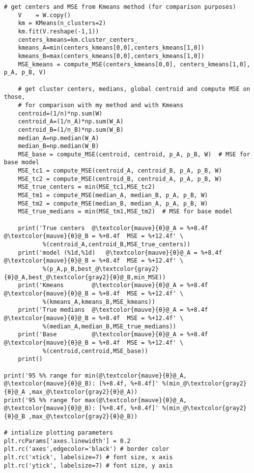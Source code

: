 \documentclass[oneside,10pt]{book}
\begin{document}
\begin{lstlisting}[escapechar=@]
    # get centers and MSE from Kmeans method (for comparison purposes)
    V    = W.copy()
    km = KMeans(n_clusters=2)
    km.fit(V.reshape(-1,1))
    centers_kmeans=km.cluster_centers_
    kmeans_A=min(centers_kmeans[0,0],centers_kmeans[1,0])
    kmeans_B=max(centers_kmeans[0,0],centers_kmeans[1,0])
    MSE_kmeans = compute_MSE(centers_kmeans[0,0], centers_kmeans[1,0], p_A, p_B, V)

    # get cluster centers, medians, global centroid and compute MSE on those,
    # for comparison with my method and with Kmeans
    centroid=(1/n)*np.sum(W)
    centroid_A=(1/n_A)*np.sum(W_A)
    centroid_B=(1/n_B)*np.sum(W_B)
    median_A=np.median(W_A)
    median_B=np.median(W_B)
    MSE_base = compute_MSE(centroid, centroid, p_A, p_B, W)  # MSE for base model
    MSE_tc1 = compute_MSE(centroid_A, centroid_B, p_A, p_B, W)
    MSE_tc2 = compute_MSE(centroid_B, centroid_A, p_A, p_B, W)
    MSE_true_centers = min(MSE_tc1,MSE_tc2)
    MSE_tm1 = compute_MSE(median_A, median_B, p_A, p_B, W)
    MSE_tm2 = compute_MSE(median_B, median_A, p_A, p_B, W)
    MSE_true_medians = min(MSE_tm1,MSE_tm2)  # MSE for base model

    print('True centers  @\textcolor{mauve}{θ}@_A = %+8.4f  @\textcolor{mauve}{θ}@_B = %+8.4f  MSE = %+12.4f' \
           %(centroid_A,centroid_B,MSE_true_centers))
    print('model (%1d,%1d)   @\textcolor{mauve}{θ}@_A = %+8.4f  @\textcolor{mauve}{θ}@_B = %+8.4f  MSE = %+12.4f' \
           %(p_A,p_B,best_@\textcolor{gray2}{θ}@_A,best_@\textcolor{gray2}{θ}@_B,min_MSE))
    print('Kmeans        @\textcolor{mauve}{θ}@_A = %+8.4f  @\textcolor{mauve}{θ}@_B = %+8.4f  MSE = %+12.4f' \
           %(kmeans_A,kmeans_B,MSE_kmeans))
    print('True medians  @\textcolor{mauve}{θ}@_A = %+8.4f  @\textcolor{mauve}{θ}@_B = %+8.4f  MSE = %+12.4f' \
           %(median_A,median_B,MSE_true_medians))
    print('Base          @\textcolor{mauve}{θ}@_A = %+8.4f  @\textcolor{mauve}{θ}@_B = %+8.4f  MSE = %+12.4f' \
           %(centroid,centroid,MSE_base))
    print()

print('95 %% range for min(@\textcolor{mauve}{θ}@_A, @\textcolor{mauve}{θ}@_B): [%+8.4f, %+8.4f]' %(min_@\textcolor{gray2}{θ}@_A ,max_@\textcolor{gray2}{θ}@_A))
print('95 %% range for max(@\textcolor{mauve}{θ}@_A, @\textcolor{mauve}{θ}@_B): [%+8.4f, %+8.4f]' %(min_@\textcolor{gray2}{θ}@_B ,max_@\textcolor{gray2}{θ}@_B))

# intialize plotting parameters
plt.rcParams['axes.linewidth'] = 0.2
plt.rc('axes',edgecolor='black') # border color
plt.rc('xtick', labelsize=7) # font size, x axis
plt.rc('ytick', labelsize=7) # font size, y axis


\end{lstlisting}
\end{document}
